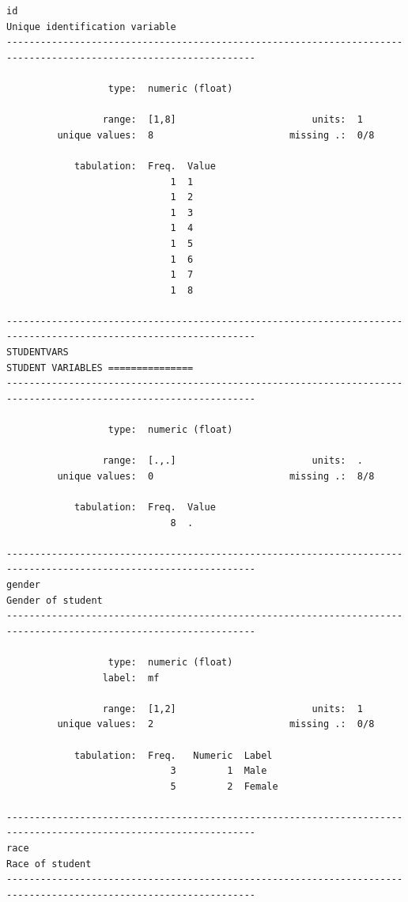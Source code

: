 \documentclass[
]{book}
\begin{document}
\begin{verbatim}
id                                                                                  Unique identification variable
------------------------------------------------------------------------------------------------------------------

                  type:  numeric (float)

                 range:  [1,8]                        units:  1
         unique values:  8                        missing .:  0/8

            tabulation:  Freq.  Value
                             1  1
                             1  2
                             1  3
                             1  4
                             1  5
                             1  6
                             1  7
                             1  8

------------------------------------------------------------------------------------------------------------------
STUDENTVARS                                                                      STUDENT VARIABLES ===============
------------------------------------------------------------------------------------------------------------------

                  type:  numeric (float)

                 range:  [.,.]                        units:  .
         unique values:  0                        missing .:  8/8

            tabulation:  Freq.  Value
                             8  .

------------------------------------------------------------------------------------------------------------------
gender                                                                                           Gender of student
------------------------------------------------------------------------------------------------------------------

                  type:  numeric (float)
                 label:  mf

                 range:  [1,2]                        units:  1
         unique values:  2                        missing .:  0/8

            tabulation:  Freq.   Numeric  Label
                             3         1  Male
                             5         2  Female

------------------------------------------------------------------------------------------------------------------
race                                                                                               Race of student
------------------------------------------------------------------------------------------------------------------


\end{verbatim}
\end{document}
